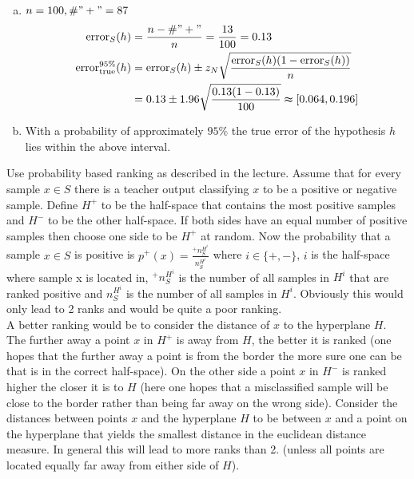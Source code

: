 \documentclass[10pt,a4paper,boxed]{hmcpset}
\begin{document}
		\begin{solution}		
			\begin{enumerate}[(a)]
				\item $n=100, \#"+"=87$
				\begin{align*}
					\textrm{error}_S(h) & = \frac{n-\#"+"}{n} = \frac{13}{100} = 0.13\\
					\textrm{error}_{\textrm{true}}^{95\%}(h) & = \textrm{error}_S(h) \pm z_N \sqrt{\frac{\textrm{error}_S(h)(1-\textrm{error}_S(h))}{n}}\\
															 & = 0.13 \pm 1.96 \sqrt{\frac{0.13(1-0.13)}{100}} \thickapprox [0.064,0.196]
				\end{align*}
					
				\item With a probability of approximately $95\%$ the true error of the hypothesis $h$ lies within the above interval.
			\end{enumerate}
			
		\end{solution}		
	\begin{problem}[5. AUC]
	\end{problem}
	\begin{solution}
		Use probability based ranking as described in the
		lecture. Assume that for every sample $x\in S$ there is
		a teacher output classifying $x$ to be a positive or
		negative sample. Define $H^+$ to be the half-space that
		contains the most positive samples and $H^-$ to be the
		other half-space. If both sides have an equal number of
		positive samples then choose one side to be $H^+$ at
		random. Now the probability that a sample $x\in S$ is
		positive is $p^+(x)=\frac{^+ n_S^{H^i}}{n_S^{H^i}}$
		where $i\in\{+,-\}$, $i$ is the half-space where sample
		x is located in, $^+ n_S^{H^i}$ is the number of all
		samples in $H^i$ that are ranked positive and
		$n_S^{H^i}$ is the number of all samples in $H^i$.
		Obviously this would only lead to 2 ranks and would be
		quite a poor ranking.\\ A better ranking would be to
		consider the distance of $x$ to the hyperplane $H$. The
		further away a point $x$ in $H^+$ is away from $H$, the
		better it is ranked (one hopes that the further away a
		point is from the border the more sure one can be that
		is in the correct half-space). On the other side a point $x$ in
		$H^-$ is ranked higher the closer it is to $H$ (here one hopes
		that a misclassified sample will be close to the border rather
		than being far away on the wrong side). Consider the distances between
		points $x$ and the hyperplane $H$ to be between $x$ and a point on the
		hyperplane that yields the smallest distance in the euclidean distance
		measure. In general this will lead to more ranks than 2. (unless all
		points are located equally far away from either side of $H$).
	\end{solution}
\end{document}
